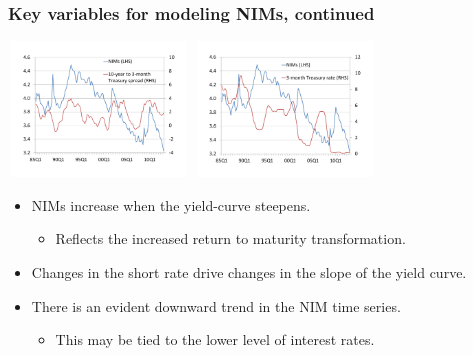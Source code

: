 \documentclass[handout]{beamer}
\begin{document}
\begin{frame}
\frametitle{Key variables for modeling NIMs, continued}

\vspace{0.1in}\hspace{0.1in}
\includegraphics[height=3.6cm,width=4.8cm]{nims_slope_crop.pdf}  \hspace{0.25in}
\includegraphics[height=3.6cm,width=4.8cm]{nims_level_crop.pdf}
\begin{itemize}
\item\vspace{0.1in} NIMs increase when the yield-curve steepens.
\begin{itemize}
\item \vspace{0.025in} Reflects the increased return to maturity transformation.
\end{itemize}
\item \vspace{0.075in} Changes in the short rate drive changes in the slope of the yield curve.
\item \vspace{0.075in} There is an evident downward trend in the NIM time series.
\begin{itemize}
\item \vspace{0.025in} This may be tied to the lower level of interest rates.
\end{itemize}
\end{itemize}
\end{frame}
\end{document}
